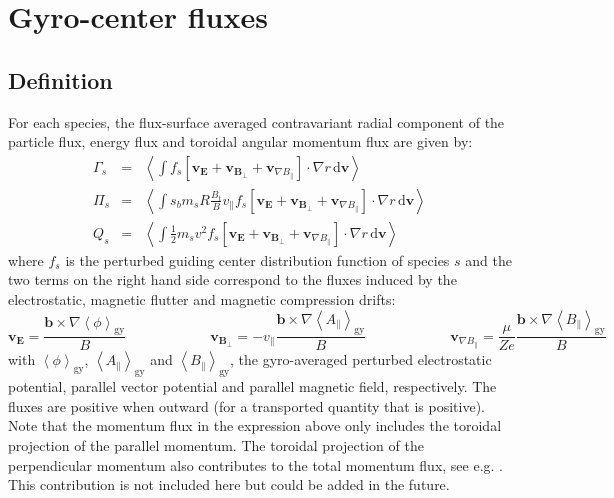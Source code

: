 \documentclass[fleqn]{report}
\begin{document}
\section{Gyro-center fluxes}
\subsection{Definition}
For each species, the flux-surface averaged contravariant radial component of the particle flux, energy flux and toroidal angular momentum flux are given by:
\begin{eqnarray}
 \Gamma_s &=& \left<\int f_s \left[\mathbf{v}_\mathbf{E} + \mathbf{v}_{\mathbf{B}_\perp} + \mathbf{v}_{\nabla B_\parallel}  \right]\cdot \nabla r\,\textrm{d}\mathbf{v}\right> \\
  \Pi_s   &=& \left<\int s_b m_s R \frac{B_t}{B}v_\parallel f_s  \left[\mathbf{v}_\mathbf{E} + \mathbf{v}_{\mathbf{B}_\perp} + \mathbf{v}_{\nabla B_\parallel}  \right] \cdot \nabla r\,\textrm{d}\mathbf{v}\right> \\
      Q_s &=& \left<\int \frac{1}{2}m_sv^2 f_s \left[\mathbf{v}_\mathbf{E} + \mathbf{v}_{\mathbf{B}_\perp} + \mathbf{v}_{\nabla B_\parallel}  \right] \cdot \nabla r\,\textrm{d}\mathbf{v}\right> 
\end{eqnarray}
where $f_s$ is the perturbed guiding center distribution function of species $s$ and the two terms on the right hand side correspond to the fluxes induced by the electrostatic, magnetic flutter and magnetic compression drifts:
\begin{equation}
 \mathbf{v}_\mathbf{E} = \frac{\mathbf{b}\times \nabla \left<\phi\right>_\textrm{gy} }{B} \qquad \qquad \qquad
 \mathbf{v}_{\mathbf{B}_\perp} = -v_\parallel \frac{\mathbf{b}\times \nabla \left<A_{\parallel}\right>_\textrm{gy}}{B}  \qquad \qquad \qquad
 \mathbf{v}_{\nabla B_\parallel} = \frac{\mu}{Ze} \frac{\mathbf{b}\times \nabla \left<B_{\parallel}\right>_\textrm{gy}}{B}
\end{equation}
with $\left<\phi\right>_\textrm{gy}$, $\left<A_{\parallel}\right>_\textrm{gy}$ and $\left<B_{\parallel}\right>_\textrm{gy}$, the gyro-averaged perturbed electrostatic potential, parallel vector potential and parallel magnetic field, respectively. The fluxes are positive when outward (for a transported quantity that is positive).\\
Note that the momentum flux in the expression above only includes the toroidal projection of the parallel momentum. The toroidal projection of the perpendicular momentum also contributes to the total momentum flux, see e.g. \cite{Scott:PoP2010}. This contribution is not included here but could be added in the future. 
\end{document}
